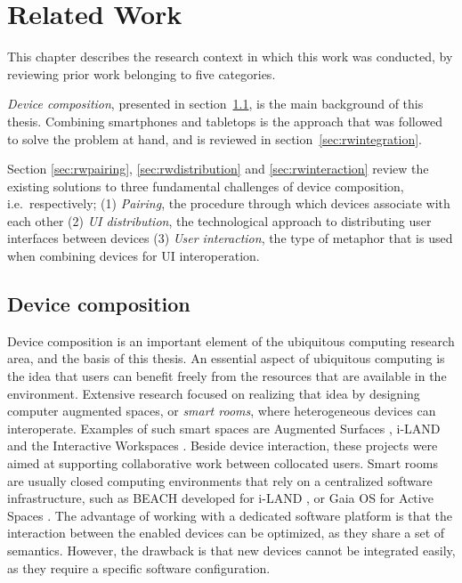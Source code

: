 \chapter{Related Work}
\label{relatedwork}

This chapter describes the research context in which this work was conducted, by reviewing prior work belonging to five categories.

\emph{Device composition}, presented in section~\ref{sec:rwcomposition}, is the main background of this thesis.
Combining smartphones and tabletops is the approach that was followed to solve the problem at hand, and is reviewed in section~\ref{sec:rwintegration}.

Section \ref{sec:rwpairing}, \ref{sec:rwdistribution} and \ref{sec:rwinteraction} review the existing solutions to three fundamental challenges of device composition, i.e.\ respectively;
(1) \emph{Pairing}, the procedure through which devices associate with each other
(2) \emph{UI distribution}, the technological approach to distributing user interfaces between devices
(3) \emph{User interaction}, the type of metaphor that is used when combining devices for UI interoperation.

\section{Device composition}
\label{sec:rwcomposition}

Device composition is an important element of the ubiquitous computing research area, and the basis of this thesis.
An essential aspect of ubiquitous computing is the idea that users can benefit freely from the resources that are available in the environment.
Extensive research focused on realizing that idea by designing computer augmented spaces, or \emph{smart rooms}, where heterogeneous devices can interoperate.
Examples of such smart spaces are Augmented Surfaces \citep{Rekimoto:1999:augmentedsurfaces}, 
\mbox{i-LAND} \citep{Streitz:1999:iland} and the Interactive Workspaces \citep{Johanson:2002:iroom}.
Beside device interaction, these projects were aimed at supporting collaborative work between collocated users.
Smart rooms are usually closed computing environments that rely on a centralized software infrastructure, such as BEACH developed for i-LAND \citep{Tandler:2001:smartenv}, or Gaia OS for Active Spaces \citep{Roman:2002:gaia}.
The advantage of working with a dedicated software platform is that the interaction between the enabled devices can be optimized, as they share a set of semantics.
However, the drawback is that new devices cannot be integrated easily, as they require a specific software configuration.

